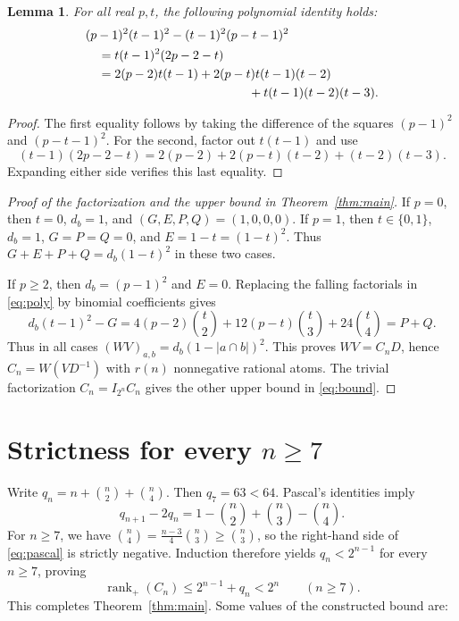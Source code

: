 \documentclass[11pt]{article}
\newtheorem{lemma}{Lemma}
\DeclareMathOperator{\rank}{rank}
\newcommand{\rankp}{\rank_{+}}
\begin{document}
\begin{lemma}\label{lem:identity}
For all real $p,t$, the following polynomial identity holds:
\begin{align}
&(p-1)^2(t-1)^2-(t-1)^2(p-t-1)^2 \notag\\
&\quad=t(t-1)^2(2p-2-t) \notag\\
&\quad=2(p-2)t(t-1)+2(p-t)t(t-1)(t-2)\notag\\
&\hspace{4.6cm}+t(t-1)(t-2)(t-3).\label{eq:poly}
\end{align}
\end{lemma}
\begin{proof}
The first equality follows by taking the difference of the squares $(p-1)^2$ and $(p-t-1)^2$. For the second, factor out $t(t-1)$ and use
\[
(t-1)(2p-2-t)=2(p-2)+2(p-t)(t-2)+(t-2)(t-3).
\]
Expanding either side verifies this last equality.
\end{proof}

\begin{proof}[Proof of the factorization and the upper bound in Theorem~\ref{thm:main}]
If $p=0$, then $t=0$, $d_b=1$, and $(G,E,P,Q)=(1,0,0,0)$. If $p=1$, then $t\in\{0,1\}$, $d_b=1$, $G=P=Q=0$, and $E=1-t=(1-t)^2$. Thus $G+E+P+Q=d_b(1-t)^2$ in these two cases.

If $p\ge2$, then $d_b=(p-1)^2$ and $E=0$. Replacing the falling factorials in \eqref{eq:poly} by binomial coefficients gives
\[
d_b(t-1)^2-G
=4(p-2)\binom t2+12(p-t)\binom t3+24\binom t4=P+Q.
\]
Thus in all cases $(WV)_{a,b}=d_b(1-|a\cap b|)^2$. This proves $WV=C_nD$, hence $C_n=W(VD^{-1})$ with $r(n)$ nonnegative rational atoms. The trivial factorization $C_n=I_{2^n}C_n$ gives the other upper bound in \eqref{eq:bound}.
\end{proof}

\newpage
\section{Strictness for every \texorpdfstring{$n\ge7$}{n >= 7}}

Write $q_n=n+\binom n2+\binom n4$. Then $q_7=63<64$. Pascal's identities imply
\begin{equation}\label{eq:pascal}
q_{n+1}-2q_n=1-\binom n2+\binom n3-\binom n4.
\end{equation}
For $n\ge7$, we have $\binom n4=\frac{n-3}{4}\binom n3\ge\binom n3$, so the right-hand side of \eqref{eq:pascal} is strictly negative. Induction therefore yields $q_n<2^{n-1}$ for every $n\ge7$, proving
\[
\rankp(C_n)\le2^{n-1}+q_n<2^n\qquad(n\ge7).
\]
This completes Theorem~\ref{thm:main}. Some values of the constructed bound are:
\end{document}
